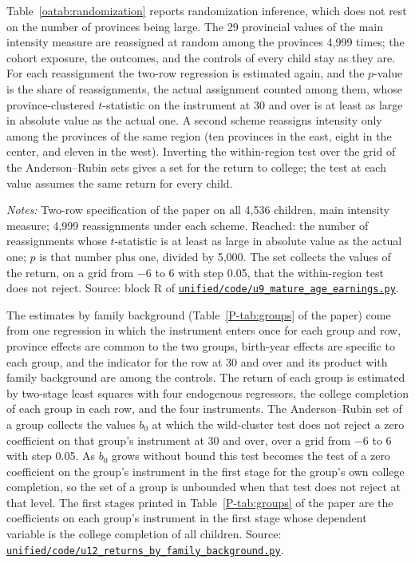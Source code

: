 \documentclass[11pt]{article}
\numberwithin{equation}{section}
\newcommand{\repourl}{https://github.com/JiachenJin1001/family-background-earnings-china}
\newcommand{\code}[1]{\href{\repourl/blob/main/#1}{\nolinkurl{#1}}}
\begin{document}
Table~\ref{oatab:randomization} reports randomization inference, which does not rest on the number of provinces being large. The 29 provincial values of the main intensity measure are reassigned at random among the provinces 4,999 times; the cohort exposure, the outcomes, and the controls of every child stay as they are. For each reassignment the two-row regression is estimated again, and the $p$-value is the share of reassignments, the actual assignment counted among them, whose province-clustered $t$-statistic on the instrument at 30 and over is at least as large in absolute value as the actual one. A second scheme reassigns intensity only among the provinces of the same region (ten provinces in the east, eight in the center, and eleven in the west). Inverting the within-region test over the grid of the Anderson--Rubin sets gives a set for the return to college; the test at each value assumes the same return for every child.

\begin{table}[H]
\centering
\small
\caption{Randomization inference for the earnings reduced form, the first stage, and the return to college.}
\label{oatab:randomization}
\setlength{\tabcolsep}{4pt}
\resizebox{\ifdim\width>\textwidth\textwidth\else\width\fi}{!}{}
\par\smallskip
\begin{minipage}{0.94\textwidth}
\footnotesize\emph{Notes:} Two-row specification of the paper on all 4,536 children, main intensity measure; 4,999 reassignments under each scheme. Reached: the number of reassignments whose $t$-statistic is at least as large in absolute value as the actual one; $p$ is that number plus one, divided by 5,000. The set collects the values of the return, on a grid from $-6$ to 6 with step 0.05, that the within-region test does not reject. Source: block R of \code{unified/code/u9_mature_age_earnings.py}.
\end{minipage}
\end{table}

The estimates by family background (Table~\ref{P-tab:groups} of the paper) come from one regression
in which the instrument enters once for each group and row, province effects are
common to the two groups, birth-year effects are specific to each
group, and the indicator for the row at 30 and over and its product
with family background are among the controls. The return of each group is estimated by two-stage least squares
with four endogenous regressors, the college completion of each group in each row,
and the four instruments. The Anderson--Rubin set of a group collects
the values $b_0$ at which the wild-cluster test does not reject a zero
coefficient on that group's instrument at 30 and over, over a grid from $-6$ to 6 with step
0.05. As $b_0$ grows without bound this test becomes the test of a zero coefficient on the group's instrument in the first stage for the group's own college completion, so the set of a group is unbounded when that test does not reject at that level. The first stages printed in Table~\ref{P-tab:groups} of the paper are the coefficients on each group's instrument in the first stage whose dependent variable is the college completion of all children. Source: \code{unified/code/u12_returns_by_family_background.py}.
\end{document}
